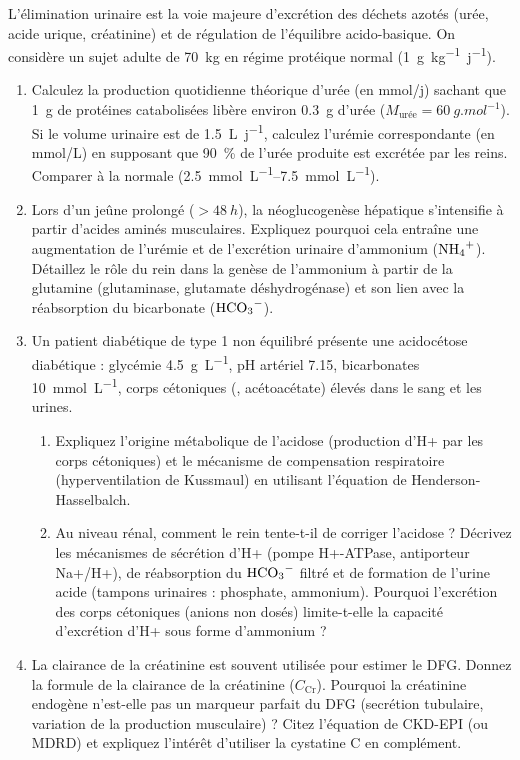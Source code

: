 \documentclass[11pt]{article}
\begin{document}
\begin{exercice}
L'élimination urinaire est la voie majeure d'excrétion des déchets azotés (urée, acide urique, créatinine) et de régulation de l'équilibre acido-basique. On considère un sujet adulte de \SI{70}{kg} en régime protéique normal (\SI{1}{g.kg^{-1}.j^{-1}}).

\begin{enumerate}
    \item Calculez la production quotidienne théorique d'urée (en mmol/j) sachant que \SI{1}{g} de protéines catabolisées libère environ \SI{0,3}{g} d'urée ($M_{\text{urée}} = \SI{60}{g.mol^{-1}}$). Si le volume urinaire est de \SI{1,5}{L.j^{-1}}, calculez l'urémie correspondante (en mmol/L) en supposant que \SI{90}{\%} de l'urée produite est excrétée par les reins. Comparer à la normale (\SIrange{2,5}{7,5}{\milli\mole\per\liter}).
    \item Lors d'un jeûne prolongé ($> \SI{48}{h}$), la néoglucogenèse hépatique s'intensifie à partir d'acides aminés musculaires. Expliquez pourquoi cela entraîne une augmentation de l'urémie et de l'excrétion urinaire d'ammonium ($\ce{NH4+}$). Détaillez le rôle du rein dans la genèse de l'ammonium à partir de la glutamine (glutaminase, glutamate déshydrogénase) et son lien avec la réabsorption du bicarbonate ($\ce{HCO3-}$).
    \item Un patient diabétique de type 1 non équilibré présente une acidocétose diabétique : glycémie \SI{4,5}{g.L^{-1}}, pH artériel \num{7,15}, bicarbonates \SI{10}{\milli\mole\per\liter}, corps cétoniques (, acétoacétate) élevés dans le sang et les urines.
    \begin{enumerate}
        \item Expliquez l'origine métabolique de l'acidose (production d'H+ par les corps cétoniques) et le mécanisme de compensation respiratoire (hyperventilation de Kussmaul) en utilisant l'équation de Henderson-Hasselbalch.
        \item Au niveau rénal, comment le rein tente-t-il de corriger l'acidose ? Décrivez les mécanismes de sécrétion d'H+ (pompe H+-ATPase, antiporteur Na+/H+), de réabsorption du $\ce{HCO3-}$ filtré et de formation de l'urine acide (tampons urinaires : phosphate, ammonium). Pourquoi l'excrétion des corps cétoniques (anions non dosés) limite-t-elle la capacité d'excrétion d'H+ sous forme d'ammonium ?
    \end{enumerate}
    \item La clairance de la créatinine est souvent utilisée pour estimer le DFG. Donnez la formule de la clairance de la créatinine ($C_{\text{Cr}}$). Pourquoi la créatinine endogène n'est-elle pas un marqueur parfait du DFG (secrétion tubulaire, variation de la production musculaire) ? Citez l'équation de CKD-EPI (ou MDRD) et expliquez l'intérêt d'utiliser la cystatine C en complément.
\end{enumerate}
\end{exercice}
\end{document}

